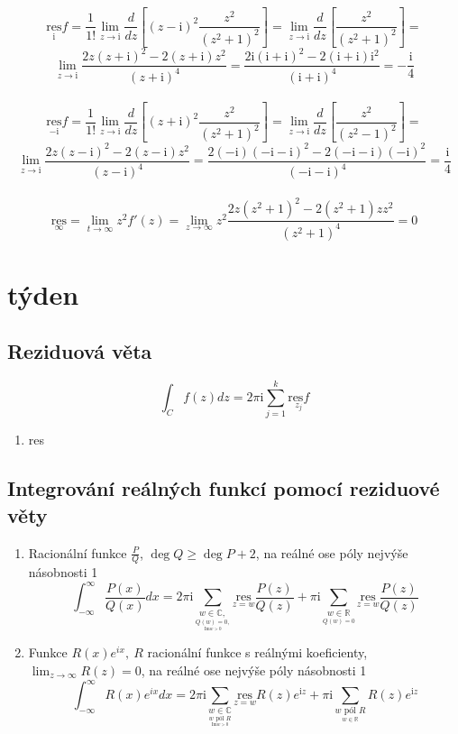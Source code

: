 \documentclass{article}
\newcommand{\mi}{\mathrm{i}}
\newcommand{\im}{\mathrm{Im}}
\newcommand{\res}{\mathrm{res}}
\begin{document}
        \[\underset{\mi}{\res}f=\frac{1}{1!}\lim_{z\to\mi}\frac{d}{dz}
        \left[(z-\mi)^2\frac{z^2}{(z^2+1)^2}\right]=\lim_{z\to\mi}\frac{d}{dz}
        \left[\frac{z^2}{(z^2+1)^2}\right]=\]
        \[\lim_{z\to\mi}\frac{2z(z+\mi)^2-2(z+\mi)z^2}{(z+\mi)^4}=
        \frac{2\mi(\mi+\mi)^2-2(\mi+\mi)\mi^2}{(\mi+\mi)^4}=-\frac{\mi}{4}\]
        \\
        \[\underset{-\mi}{\res}f=\frac{1}{1!}\lim_{z\to\mi}\frac{d}{dz}
        \left[(z+\mi)^2\frac{z^2}{(z^2+1)^2}\right]=\lim_{z\to\mi}\frac{d}{dz}
        \left[\frac{z^2}{(z^2-1)^2}\right]=\]
        \[\lim_{z\to\mi}\frac{2z(z-\mi)^2-2(z-\mi)z^2}{(z-\mi)^4}=
        \frac{2(-\mi)(-\mi-\mi)^2-2(-\mi-\mi)(-\mi)^2}{(-\mi-\mi)^4}=\frac{\mi}{4}\]
        \\
        \[\underset{\infty}{\res}=\lim_{t\to\infty}z^2f'(z)=
        \lim_{z\to\infty}z^2\frac{2z(z^2+1)^2-2(z^2+1)zz^2}{(z^2+1)^4}=0\]
    \section{týden}%
    \subsection{Reziduová věta}
        \[\int_Cf(z)dz=2\pi\mi\sum_{j=1}^{k}\underset{z_j}{\res f}\]
        \begin{enumerate}
            \item res
        \end{enumerate}
    \subsection{Integrování reálných funkcí pomocí reziduové věty}
        \begin{enumerate}
            \item Racionální funkce $\frac{P}{Q}$, $\deg Q \geq \deg P+2$, na reálné ose
                    póly nejvýše násobnosti 1
                \[\int_{-\infty}^{\infty}\frac{P(x)}{Q(x)}dx=2\pi\mi\sum_{\underset{\underset{\im w>0}{Q(w)=0,}}{w\in\mathbb{C},}}
                \underset{z=w}{\res}\frac{P(z)}{Q(z)}+\pi\mi\sum_{\underset{Q(w)=0}{w\in\mathbb{R}}}\underset{{z=w}}{\res}
                \frac{P(z)}{Q(z)}\] 
            \item Funkce $R(x)e^{ix},\:R$ racionální funkce s reálnými koeficienty,
                $\lim_{z\to\infty} R(z)=0$, na reálné ose nejvýše póly násobnosti 1
                \[\int_{-\infty}^{\infty}R(x)e^{ix}dx=2\pi\mi\sum_{\underset{\underset{\im w>0}{w\mbox{ pól } R}}{w\in\mathbb{C}}}
                \underset{z=w}{\res}R(z)e^{\mi z}+\pi\mi\sum_{\underset{w\in\mathbb{R}}{w\mbox{ pól }R}}R(z)e^{\mi z}\]
        \end{enumerate}
\end{document}
